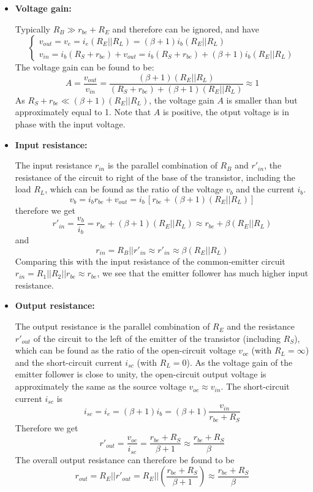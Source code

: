 \begin{itemize}
\item {\bf Voltage gain:}

  Typically $R_B \gg r_{be}+R_E$ and therefore can be ignored, and have
  \[
  \left\{ \begin{array}{l} 
    v_{out}=v_e=i_e (R_E||R_L)=(\beta+1) i_b (R_E||R_L) 	\\
    v_{in}=i_b (R_S+r_{be})+v_{out}=i_b (R_S+r_{be})+(\beta+1) i_b (R_E||R_L)
  \end{array} \right. 
  \]
  The voltage gain can be found to be:
  \[
  A=\frac{v_{out}}{v_{in}}
  =\frac{(\beta+1) (R_E||R_L)}{(R_S+r_{be})+(\beta+1) (R_E||R_L)} \approx 1 
  \]
  As $R_S+r_{be} \ll (\beta+1) (R_E||R_L)$, the voltage gain $A$ is smaller 
  than but approximately equal to 1. Note that $A$ is positive, the otput
  voltage is in phase with the input voltage.

\item {\bf Input resistance:} 

  The input resistance $r_{in}$ is the parallel combination of $R_B$ and 
  $r'_{in}$, the resistance of the circuit to right of the base of the 
  transistor, including the load $R_L$, which can be found as the ratio 
  of the voltage $v_b$ and the current $i_b$. 
  \[
  v_b=i_b r_{be}+v_{out}=i_b\, [ r_{be}+(\beta+1)(R_E||R_L) ]
  \]
  therefore we get
  \[
  r'_{in}=\frac{v_b}{i_b}=r_{be}+(\beta+1) (R_E||R_L)
  \approx r_{be}+\beta (R_E||R_L)
  \]
  and 
  \[
  r_{in}=R_B||r'_{in} \approx r'_{in}\approx \beta (R_E||R_L)
  \]
  Comparing this with the input resistance of the common-emitter circuit
  $r_{in}=R_1||R_2|| r_{be} \approx r_{be}$, we see that the emitter follower 
  has much higher input resistance.

\item {\bf Output resistance:}

  The output resistance is the parallel combination of $R_E$ and the 
  resistance $r'_{out}$ of the circuit to the left of the emitter of the
  transistor (including $R_S$), which can  be found as the ratio of the 
  open-circuit voltage $v_{oc}$ (with $R_L=\infty$) and the short-circuit 
  current $i_{sc}$ (with $R_L=0$). As the voltage gain of the emitter 
  follower is close to unity, the open-circuit output voltage is 
  approximately the same as the source voltage $v_{oc}\approx v_{in}$. The
  short-circuit current $i_{sc}$ is
  \[
  i_{sc}=i_e=(\beta+1)i_b=(\beta+1)\frac{v_{in}}{r_{be}+R_S}
  \]
  Therefore we get
  \[
  r'_{out}=\frac{v_{oc}}{i_{sc}}=\frac{r_{be}+R_S}{\beta+1}
  \approx\frac{r_{be}+R_S}{\beta} 
  \]
  The overall output resistance can therefore be found to be
  \[
  r_{out}	= R_E || r'_{out}=R_E || \left(\frac{r_{be}+R_S}{\beta+1}\right)
  \approx \frac{r_{be}+R_S}{\beta}	
  \]
\end{itemize}


